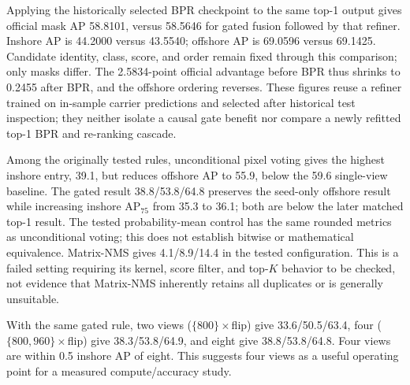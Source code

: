 Applying the historically selected BPR checkpoint to the same top-1 output gives official mask AP 58.8101, versus 58.5646 for gated fusion followed by that refiner. Inshore AP is 44.2000 versus 43.5540; offshore AP is 69.0596 versus 69.1425. Candidate identity, class, score, and order remain fixed through this comparison; only masks differ. The 2.5834-point official advantage before BPR thus shrinks to 0.2455 after BPR, and the offshore ordering reverses. These figures reuse a refiner trained on in-sample carrier predictions and selected after historical test inspection; they neither isolate a causal gate benefit nor compare a newly refitted top-1 BPR and re-ranking cascade.

Among the originally tested rules, unconditional pixel voting gives the highest inshore entry, 39.1, but reduces offshore AP to 55.9, below the 59.6 single-view baseline. The gated result 38.8/53.8/64.8 preserves the seed-only offshore result while increasing inshore AP$_{75}$ from 35.3 to 36.1; both are below the later matched top-1 result. The tested probability-mean control has the same rounded metrics as unconditional voting; this does not establish bitwise or mathematical equivalence. Matrix-NMS gives 4.1/8.9/14.4 in the tested configuration. This is a failed setting requiring its kernel, score filter, and top-$K$ behavior to be checked, not evidence that Matrix-NMS inherently retains all duplicates or is generally unsuitable.

With the same gated rule, two views ($\{800\}\times$flip) give 33.6/50.5/63.4, four ($\{800,960\}\times$flip) give 38.3/53.8/64.9, and eight give 38.8/53.8/64.8. Four views are within 0.5 inshore AP of eight. This suggests four views as a useful operating point for a measured compute/accuracy study.



